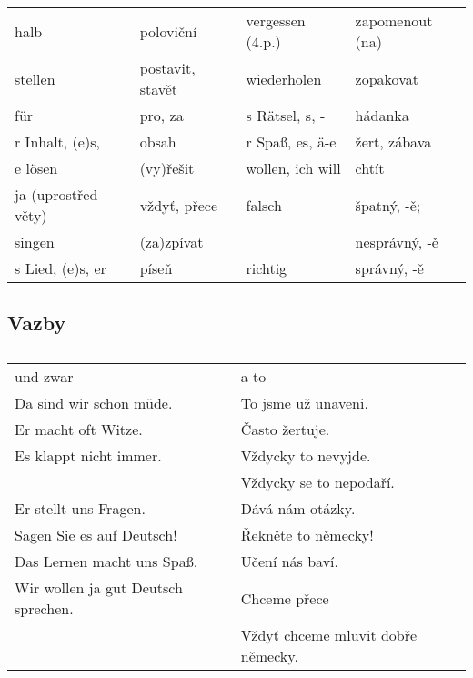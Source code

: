 \begin{table}[ht!]
\begin{tabular}{llll}
          halb                 & poloviční          & vergessen (4.p.) & zapomenout (na)          \\
          stellen              & postavit, stavět   & wiederholen      & zopakovat                \\
          für                  & pro, za            & s Rätsel, s, -   & hádanka                  \\
        \hline
          r Inhalt, (e)s,      & obsah              & r Spaß, es, ä-e  & žert, zábava             \\
          e lösen              & (vy)řešit          & wollen, ich will & chtít                    \\
          ja {\scriptsize (uprostřed věty)} & vždyť, přece   & falsch  & špatný, -ě;              \\
          singen               & (za)zpívat         &                  & nesprávný, -ě            \\
          s Lied, (e)s, er     & píseň              & richtig          & správný, -ě              \\
        \hline 
      \end{tabular}
      \caption*{ }
    \end{table}
    \newpage
    \subsection*{Vazby}
      \begin{table}[ht!]   %
        \begin{tabular}{ll}
          \hline
          und zwar                            & a to                                             \\
          Da sind wir schon müde.             & To jsme už unaveni.                              \\
          Er macht oft Witze.                 & Často žertuje.                                   \\
          Es klappt nicht immer.              & Vždycky to nevyjde.                              \\
                                              & Vždycky se to nepodaří.                          \\
          Er stellt uns Fragen.               & Dává nám otázky.                                 \\
          Sagen Sie es auf Deutsch!           & Řekněte to německy!                              \\
          Das Lernen macht uns Spaß.          & Učení nás baví.                                  \\
          Wir wollen ja gut Deutsch sprechen. & Chceme přece                                     \\
                                              & Vždyť chceme mluvit dobře německy.               \\
          \hline
        \end{tabular}
        \caption*{ }
      \end{table}
      
